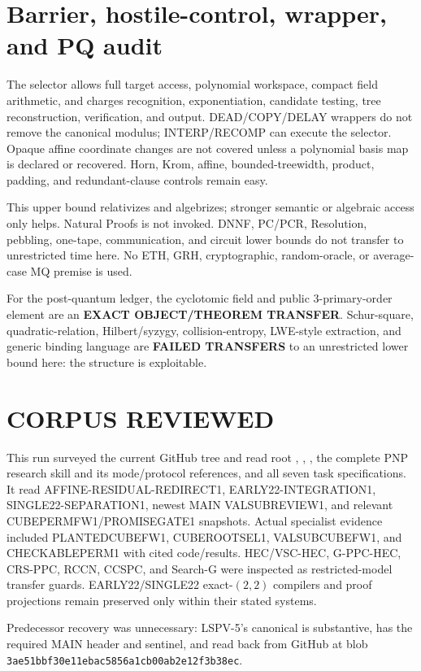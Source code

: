 \documentclass[11pt]{article}
\begin{document}
\section{Barrier, hostile-control, wrapper, and PQ audit}
The selector allows full target access, polynomial workspace, compact field
arithmetic, and charges recognition, exponentiation, candidate testing,
tree reconstruction, verification, and output.  DEAD/COPY/DELAY wrappers do
not remove the canonical modulus; INTERP/RECOMP can execute the selector.
Opaque affine coordinate changes are not covered unless a polynomial basis
map is declared or recovered.  Horn, Krom, affine, bounded-treewidth,
product, padding, and redundant-clause controls remain easy.

This upper bound relativizes and algebrizes; stronger semantic or algebraic
access only helps.  Natural Proofs is not invoked.  DNNF, PC/PCR,
Resolution, pebbling, one-tape, communication, and circuit lower bounds do
not transfer to unrestricted time here.  No ETH, GRH, cryptographic,
random-oracle, or average-case MQ premise is used.

For the post-quantum ledger, the cyclotomic field and public
$3$-primary-order element are an \textbf{EXACT OBJECT/THEOREM TRANSFER}.
Schur-square, quadratic-relation, Hilbert/syzygy, collision-entropy,
LWE-style extraction, and generic binding language are \textbf{FAILED
TRANSFERS} to an unrestricted lower bound here: the structure is exploitable.

\section{CORPUS REVIEWED}
This run surveyed the current GitHub tree and read root ,
, , the complete PNP research skill and its
mode/protocol references, and all seven task specifications.  It read
AFFINE-RESIDUAL-REDIRECT1, EARLY22-INTEGRATION1, SINGLE22-SEPARATION1,
newest MAIN VALSUBREVIEW1, and relevant CUBEPERMFW1/PROMISEGATE1 snapshots.
Actual specialist evidence included PLANTEDCUBEFW1, CUBEROOTSEL1,
VALSUBCUBEFW1, and CHECKABLEPERM1 with cited code/results.  HEC/VSC-HEC,
G-PPC-HEC, CRS-PPC, RCCN, CCSPC, and Search-G were inspected as
restricted-model transfer guards.  EARLY22/SINGLE22 exact-$(2,2)$ compilers
and proof projections remain preserved only within their stated systems.

Predecessor recovery was unnecessary: LSPV-5's canonical
 is substantive,
has the required MAIN header and sentinel, and read back from GitHub at blob
\texttt{3ae51bbf30e11ebac5856a1cb00ab2e12f3b38ec}.
\end{document}
